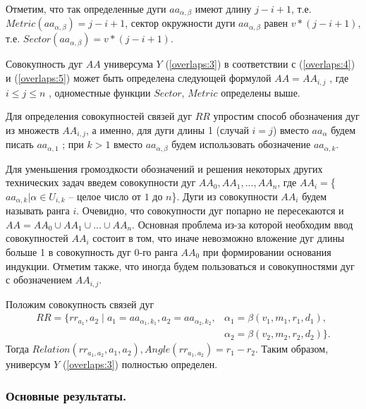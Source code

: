 Отметим, что так определенные дуги  $aa_{\alpha,\beta}$  имеют длину $j - i + 1$,  т.е. $Metric(aa_{\alpha,\beta}) =  j - i + 1$,  сектор окружности дуги  $aa_{\alpha,\beta}$  равен  $v * (j - i + 1)$, т.е. $Sector(aa_{\alpha,\beta}) =  v * (j - i + 1)$.

Совокупность дуг  $AA$  универсума  $Y$  (\ref{overlaps:3}) в соответствии с  (\ref{overlaps:4})   и  (\ref{overlaps:5})  может быть определена следующей формулой $AA  =   AA_{i,j}$ , где $i \leq j \leq n$ , одноместные  функции  $Sector$, $Metric$  определены выше.

Для определения  совокупностей связей дуг  $RR$ упростим способ обозначения дуг  из множеств   $AA_{i,j}$, а именно, для дуги длины  1  (случай  $i  = j$)  вместо $aa_\alpha$ будем писать $aa_{\alpha,1}$ ; при  $k > 1$ вместо $aa_{\alpha,\beta}$  будем использовать обозначение $aa_{\alpha, k}$.   

Для уменьшения громоздкости  обозначений и решения некоторых других технических задач введем совокупности дуг  $AA_0, AA_1,..., AA_n$, где  
$AA_i = $\{$aa_{\alpha, k} | \alpha \in U_{i,k}$ -- целое число от $1$  до  $n$\}.  Дуги из совокупности $AA_i$  будем называть ранга  $i$.  Очевидно, что совокупности дуг  попарно не пересекаются и $AA = AA_0 \cup AA_1 \cup ...\cup AA_n$. Основная проблема из-за  которой необходим ввод совокупностей  $AA_i$  состоит в том, что иначе невозможно вложение дуг длины больше  1 в совокупность дуг 0-го ранга  $AA_0$  при формировании основания индукции. Отметим также, что иногда будем пользоваться и совокупностями дуг с обозначением  $AA_{i,j}$. 

Положим   совокупность связей дуг  
\begin{equation}
\begin{split}
RR=\{rr_{a_1}, a_2\;|\;a_1 = aa_{\alpha_1,k_1} , a_2 = aa_{\alpha_2,k_2}, &\alpha_1= \beta(v_1,m_1,r_1,d_1), \\
&\alpha_2 = \beta(v_2,m_2,r_2,d_2) \}.   
\end{split}
\label{overlaps:6}     
\end{equation}
Тогда  $Relation(rr_{a_1, a_2}, a_1, a_2),  Angle(rr_{a_1, a_2}) = r_1 - r_2.$
Таким образом,  универсум  $Y$ (\ref{overlaps:3})   полностью определен. \\


\subsubsection{Основные результаты.}

